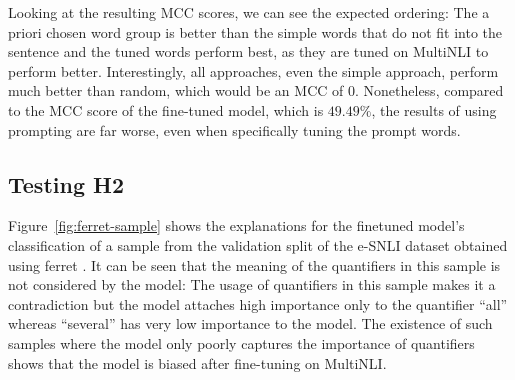 Looking at the resulting \ac{MCC} scores, we can see the expected ordering: The a priori chosen word group is better than the simple words that do not fit into the sentence and the tuned words perform best, as they are tuned on \ac{MultiNLI} to perform better. Interestingly, all approaches, even the simple approach, perform much better than random, which would be an \ac{MCC} of $0$. Nonetheless, compared to the \ac{MCC} score of the fine-tuned model, which is $49.49\%$, the results of using prompting are far worse, even when specifically tuning the prompt words.

\subsection{Testing H2}
Figure~\ref{fig:ferret-sample} shows the explanations for the finetuned model's classification of a sample from the validation split of the \ac{e-SNLI} dataset obtained using ferret \cite{ferret}. It can be seen that the meaning of the quantifiers in this sample is not considered by the model: The usage of quantifiers in this sample makes it a contradiction but the model attaches high importance only to the quantifier \enquote{all} whereas \enquote{several} has very low importance to the model. The existence of such samples where the model only poorly captures the importance of quantifiers shows that the model is biased after fine-tuning on \ac{MultiNLI}.

